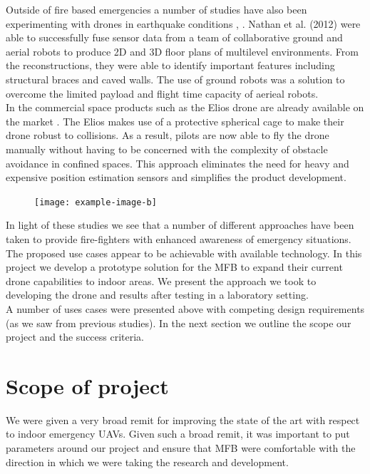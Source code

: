 \documentclass[capstone_report.tex]{subfiles}
\begin{document}
    Outside of fire based emergencies a number of studies have also been experimenting with drones in earthquake conditions \cite{kruijff2012rescue}, \cite{michael2012collaborative}.  Nathan et al. (2012)  were able to successfully fuse sensor data from a team of collaborative ground and aerial robots to produce 2D and 3D floor plans of multilevel environments.  From the reconstructions, they were able to identify important features including structural braces and caved walls.  The use of ground robots was a solution to overcome the limited payload and flight time capacity of aerieal robots.\\

    In the commercial space products such as the Elios drone are already available on the market \cite{Elios}.  The Elios makes use of a protective spherical cage to make their drone robust to collisions.  As a result, pilots are now able to fly the drone manually without having to be concerned with the complexity of obstacle avoidance in confined spaces.  This approach eliminates the need for heavy and expensive position estimation sensors and simplifies the product development.\\

    \begin{figure}[H]
	\centering
        \texttt{[image: example-image-b]}
        \label{fig:fire_proof_drone}
    \end{figure}

    In light of these studies we see that a number of different approaches have been taken to provide fire-fighters with enhanced awareness of emergency situations.  The proposed use cases appear to be achievable with available technology.  In this project we develop a prototype solution for the MFB to expand their current drone capabilities to indoor areas.  We present the approach we took to developing the drone and results after testing in a laboratory setting.\\

    A number of uses cases were presented above with competing design requirements (as we saw from previous studies).  In the next section we outline the scope our project and the success criteria.


\section{Scope of project}
We were given a very broad remit for improving the state of the art with respect to indoor emergency UAVs. Given such a broad remit, it was important to put parameters around our project and ensure that MFB were comfortable with the direction in which we were taking the research and development.\\
\end{document}

